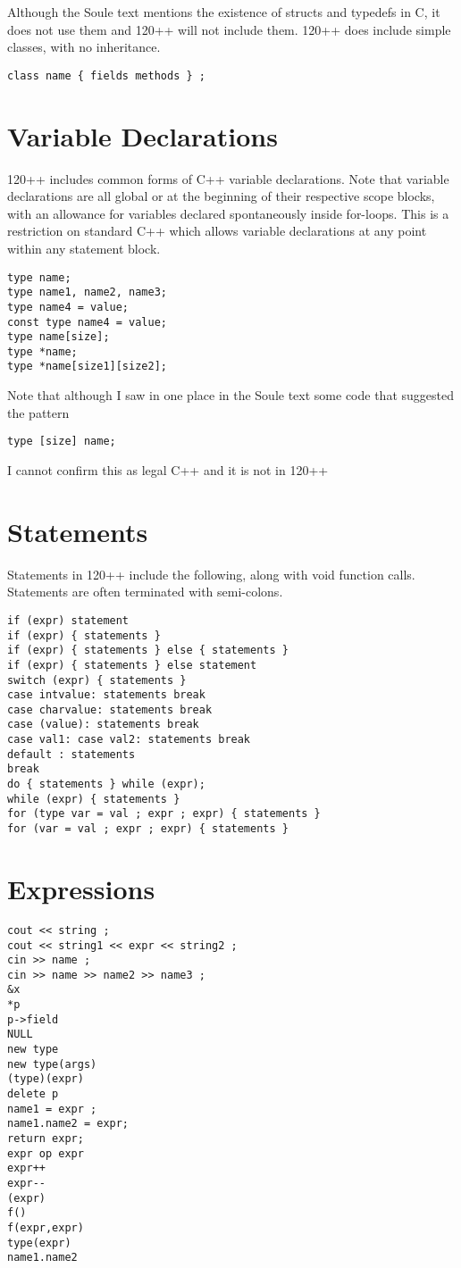 Although the Soule text mentions the existence of structs and typedefs
in C, it does not use them and 120++ will not include them.
120++ does include simple classes, with no inheritance.

\begin{verbatim}
class name { fields methods } ;
\end{verbatim}

\section{Variable Declarations}

120++ includes common forms of C++ variable declarations.
Note that variable declarations are all global or at the beginning
of their respective scope blocks, with an allowance for variables
declared spontaneously inside for-loops.  This is a restriction on
standard C++ which allows variable declarations at any point within
any statement block.

\begin{verbatim}
type name;
type name1, name2, name3;
type name4 = value;
const type name4 = value;
type name[size];
type *name;
type *name[size1][size2];
\end{verbatim}

Note that although I saw in one place in the Soule text some code
that suggested the pattern

\begin{verbatim}
type [size] name;
\end{verbatim}

I cannot confirm this as legal C++ and it is not in 120++

\section{Statements}

Statements in 120++ include the following, along with void
function calls.
Statements are often terminated with semi-colons.

\begin{verbatim}
if (expr) statement
if (expr) { statements }
if (expr) { statements } else { statements }
if (expr) { statements } else statement
switch (expr) { statements }
case intvalue: statements break
case charvalue: statements break
case (value): statements break
case val1: case val2: statements break
default : statements
break
do { statements } while (expr);
while (expr) { statements }
for (type var = val ; expr ; expr) { statements }
for (var = val ; expr ; expr) { statements }
\end{verbatim}

\section{Expressions}

\begin{verbatim}
cout << string ;
cout << string1 << expr << string2 ;
cin >> name ;
cin >> name >> name2 >> name3 ;
&x
*p
p->field
NULL
new type
new type(args)
(type)(expr)
delete p
name1 = expr ;
name1.name2 = expr;
return expr;
expr op expr
expr++
expr--
(expr)
f()
f(expr,expr)
type(expr)
name1.name2
\end{verbatim}
